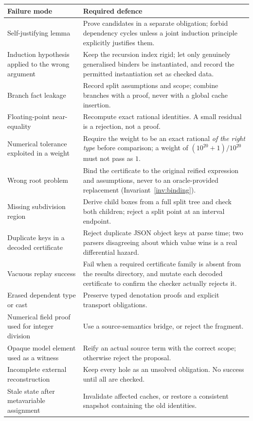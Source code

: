 \begin{longtable}{@{}>{\raggedright\arraybackslash}p{}>{\raggedright\arraybackslash}p{}@{}}
\toprule
Failure mode & Required defence \\
\midrule
\endhead
Self-justifying lemma &
Prove candidates in a separate obligation; forbid dependency cycles unless a
joint induction principle explicitly justifies them. \\
Induction hypothesis applied to the wrong argument &
Keep the recursion index rigid; let only genuinely generalised binders be
instantiated, and record the permitted instantiation set as checked data. \\
Branch fact leakage &
Record split assumptions and scope; combine branches with a proof, never with
a global cache insertion. \\
Floating-point near-equality &
Recompute exact rational identities. A small residual is a rejection, not a
proof. \\
Numerical tolerance exploited in a weight &
Require the weight to be an exact rational \emph{of the right type} before
comparison; a weight of $(10^{20}+1)/10^{20}$ must not pass as $1$. \\
Wrong root problem &
Bind the certificate to the original reified expression and assumptions, never
to an oracle-provided replacement (Invariant~\ref{inv:binding}). \\
Missing subdivision region &
Derive child boxes from a full split tree and check both children; reject a
split point at an interval endpoint. \\
Duplicate keys in a decoded certificate &
Reject duplicate JSON object keys at parse time; two parsers disagreeing about
which value wins is a real differential hazard. \\
Vacuous replay success &
Fail when a required certificate family is absent from the results directory,
and mutate each decoded certificate to confirm the checker actually rejects
it. \\
Erased dependent type or cast &
Preserve typed denotation proofs and explicit transport obligations. \\
Numerical field proof used for integer division &
Use a source-semantics bridge, or reject the fragment. \\
Opaque model element used as a witness &
Reify an actual source term with the correct scope; otherwise reject the
proposal. \\
Incomplete external reconstruction &
Keep every hole as an unsolved obligation. No success until all are checked. \\
Stale state after metavariable assignment &
Invalidate affected caches, or restore a consistent snapshot containing the
old identities. \\
\bottomrule
\end{longtable}

